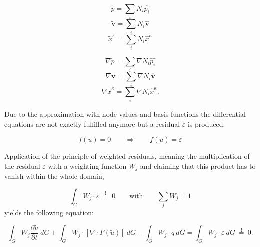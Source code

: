 \begin{minipage}[b]{0.47\textwidth}
\begin{equation}
\label{eq:p} 
	\tilde p = \sum_i N_i \hat{p_i}
\end{equation}
\begin{equation}
\label{eq:v} 
	\tilde{\mathbf v} = \sum_i N_i \hat{\mathbf v}
\end{equation}
\begin{equation}
\label{eq:x} 
	\tilde x^\kappa  = \sum_i N_i \hat x^\kappa 
\end{equation}
\end{minipage}
\hfill
\begin{minipage}[b]{0.47\textwidth}
\begin{equation}
\label{eq:dp} 
	\nabla \tilde p = \sum_i \nabla N_i \hat{p_i}
\end{equation}
\begin{equation}
\label{eq:dv} 
	\nabla \tilde{\mathbf v} = \sum_i \nabla N_i \hat{\mathbf v}
\end{equation}
\begin{equation}
\label{eq:dx} 
	\nabla \tilde x^\kappa  = \sum_i \nabla N_i \hat x^\kappa .
\end{equation}
\end{minipage} 

Due to the approximation with node values and basis functions the differential equations are not exactly fulfilled anymore but a residual $\varepsilon$ is produced.

\begin{equation}
	f(u) = 0  \qquad \Rightarrow \qquad f(\tilde u) = \varepsilon
\end{equation}

Application of the principle of weighted residuals, meaning the multiplication of the residual $\varepsilon$ with a weighting function $W_j$  and claiming that this product has to vanish within the whole domain,

\begin{equation}
	\int_G W_j \cdot \varepsilon \: \overset {!}{=} \: 0 \qquad \textrm{with} \qquad \sum_j W_j =1
\end{equation}
yields the following equation:

\begin{equation}
	\int_G W_j \frac{\partial \tilde u}{\partial t} \: dG + \int_G W_j \cdot \left[ \nabla \cdot F(\tilde u) \right]  \: dG - \int_G W_j \cdot q \: dG = \int_G W_j \cdot \varepsilon \: dG \: \overset {!}{=} \: 0 .
\end{equation}

